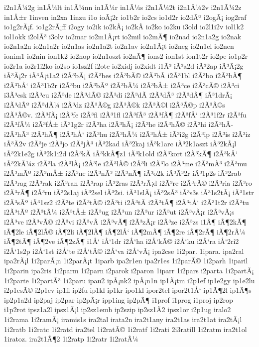 {i2n1Ã¼2g
in1Ã¼lt
in1Ã¼nn
in1Ã¼r
in1Ã¼s
i2n1Ã¼2t
i2n1Ã¼2v
i2n1Ã¼2z
in1Å±r
1inven
in2xa
1inzu
i1o
ioÃ¡2r
io1b2r
io2cs
io1d2r
io2dÃº
i2ogÃ¡
iog2raf
io1g2rÃ¡f.
io1g2rÃ¡ff
i2ogy
io2ik
io2kÃ¡
io2kÃ­
io2ko
io2ku
i3old
io2l1i2v
iol1k2
iol1okk
i2olÃ³
i3olv
io2mar
io2m1Ã¡rt
io2mil
io2mÃ¶
io2nad
io2n1a2g
io2nak
io2n1a2n
io2n1a2r
io2n1as
io2n1a2t
io2n1av
io2n1Ã¡t
io2neg
io2n1el
io2nen
ionim1
io2nin
ion1k2
io2nop
io2n1oszt
io2nÃ¶
ions2
ion1st
ion1t2r
io2pe
io1p2r
io2r1a
io2r1i2ko
io2so
io1sz2f
i2ote
io2xidj
io2xidt
i1Ã³
iÃ³a2d
iÃ³2ap
iÃ³Ã¡2g
iÃ³Ã¡2r
iÃ³Ã¡t1a2
i2Ã³bÃ¡
i2Ã³bes
i2Ã³bÃ©
i2Ã³bÃ­
i2Ã³1bl
i2Ã³bo
i2Ã³bÃ¶
i2Ã³bÅ‘
i2Ã³1b2r
i2Ã³bu
i2Ã³bÃº
i2Ã³bÃ¼
i2Ã³bÅ±
i2Ã³ce
i2Ã³cÃ©
i2Ã³ci
i3Ã³csk
i2Ã³cu
i2Ã³de
i2Ã³dÃ©
i2Ã³di
i2Ã³dÃ­
i2Ã³dÃ³
i2Ã³dÃ¶
iÃ³1drÃ¡
i2Ã³dÃº
i2Ã³dÃ¼
i2Ã³dz
i2Ã³Ã©g
i2Ã³Ã©k
i2Ã³Ã©l
i2Ã³Ã©p
i2Ã³Ã©s
i2Ã³Ã©v.
i2Ã³fÃ¡
i2Ã³fe
i2Ã³fi
i2Ã³1fl
i2Ã³fÃ³
i2Ã³fÃ¶
i2Ã³fÅ‘
i2Ã³1f2r
i2Ã³fu
i2Ã³fÃ¼
i2Ã³fÅ±
iÃ³1g2r
i2Ã³ha
i2Ã³hÃ¡
i2Ã³he
i2Ã³hÃ©
i2Ã³hi
i2Ã³hÃ­
i2Ã³hÃ³
i2Ã³hÃ¶
i2Ã³hÅ‘
i2Ã³hu
i2Ã³hÃ¼
i2Ã³hÅ±
iÃ³i2g
i2Ã³ip
i2Ã³is
i2Ã³iz
iÃ³Ã­2v
i2Ã³je
i2Ã³jo
i2Ã³jÃ³
iÃ³2kad
iÃ³2kaj
iÃ³k1arc
iÃ³2k1aszt
iÃ³2kÃ¡l
iÃ³2k1e2g
iÃ³2k1i2d
i2Ã³kÃ­
iÃ³kkÃ¶z1
iÃ³k1old
i2Ã³kort
i2Ã³kÃ¶
i2Ã³kÅ‘
iÃ³2kÃ¼z
i2Ã³la
i2Ã³lÃ¡
i2Ã³le
i2Ã³lÃ©
i2Ã³li
i2Ã³lo
i2Ã³me
i2Ã³mÃ³
i2Ã³mu
i2Ã³mÃº
i2Ã³mÅ±
i2Ã³ne
i2Ã³nÃ³
i2Ã³nÃ¶
iÃ³o2k
iÃ³Ã³2r
iÃ³1p2s
iÃ³2rab
i2Ã³rag
i2Ã³rak
i2Ã³ran
i2Ã³rap
iÃ³2ras
i2Ã³rÃ¡d
i2Ã³re
i2Ã³rÃ©
i2Ã³ria
i2Ã³ro
i2Ã³rÃ¶
i2Ã³ru
iÃ³2s1aj
iÃ³2sel
iÃ³2si.
iÃ³1slÃ¡
iÃ³2sÃ³
iÃ³s3s
iÃ³1s2tÃ¡
iÃ³1str
i2Ã³sÃº
iÃ³1sz2
i2Ã³te
i2Ã³tÃ©
i2Ã³ti
i2Ã³tÃ­
i2Ã³tÃ¶
i2Ã³tÅ‘
i2Ã³1t2r
i2Ã³tu
i2Ã³tÃº
i2Ã³tÃ¼
i2Ã³tÅ±
i2Ã³ug
i2Ã³un
i2Ã³ur
i2Ã³ut
i2Ã³vÃ¡r
i2Ã³vÃ¡s
i2Ã³ve
i2Ã³vÃ©
i2Ã³vi
i2Ã³vÃ­
i2Ã³vÃ¶
i2Ã³zÃ¡r
i2Ã³ze
i2Ã³zs
i1Ã¶
iÃ¶2kÃ¶
iÃ¶2le
iÃ¶2lÃ©
iÃ¶2li
iÃ¶2lÃ¶
iÃ¶2lÅ‘
iÃ¶2mÃ¶
iÃ¶2re
iÃ¶2rÃ¶
iÃ¶2rÃ¼
iÃ¶2tÃ¶
iÃ¶2ve
iÃ¶2zÃ¶
i1Å‘
iÅ‘1dr
i2Å‘ha
i2Å‘kÃ©
i2Å‘ku
i2Å‘ra
iÅ‘2ri2
i2Å‘1s2p
i2Å‘1st
i2Å‘te
i2Å‘tÃ©
i2Å‘va
i2Å‘vÃ¡
ipa2cse
1i2par.
1ipara.
ipa2ral
ipa2rÃ¡l
1i2parÃ¡n
1i2parÃ¡t
1iparb
ipa2r1en
ipa2r1es
1i2parÃ©
1i2parh
1iparil
1i2parin
ipa2ris
1i2parm
1i2parn
i2parok
i2paron
1iparr
1i2pars
i2parta
1i2partÃ¡
1i2parte
1i2partÃ³
1i2paru
ipau2
ipÃ¡nk2
ipÃ¡n1n
ip1Ã¡tm
i2p1ef
ip1e2gy
ip1e2lu
i2p1esÃ©
i2p1ev
ip1fl
ip2fu
ip1kl
ip1kr
ipo1kl
ipor2tel
ipor2t1Å‘
ip1Ã¶2l
ip1Ã¶s
ip2p1a2d
ip2paj
ip2par
ip2pÃ¡r
ipp1ing
ip2pÃ¶
i1prof
i1prog
i1proj
ip2rop
i1p2rot
ipsz1a2l
ipsz1Ã¡l
ip2sz1emb
ip2szip
ip2sz1Ã­2
ipsz1or
i2p1ug
iralo2
1i2rama
1i2ramÃ¡
iramis1s
ira2tal
irata2n
ira2t1any
ira2t1as
ira2t1at
ira2tÃ¡l
1i2ratb
1i2ratc
1i2ratd
ira2tel
1i2ratÃ©
1i2ratf
1i2rati
2i3ratill
1i2ratm
ira2t1ol
1iratoz.
ira2t1Ã¶2
1i2ratp
1i2ratr
1i2ratÃ¼
}
